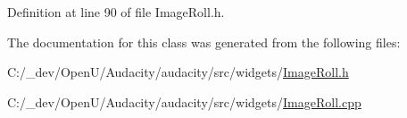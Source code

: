Definition at line 90 of file Image\+Roll.\+h.



The documentation for this class was generated from the following files\+:\begin{DoxyCompactItemize}
\item 
C\+:/\+\_\+dev/\+Open\+U/\+Audacity/audacity/src/widgets/\hyperlink{_image_roll_8h}{Image\+Roll.\+h}\item 
C\+:/\+\_\+dev/\+Open\+U/\+Audacity/audacity/src/widgets/\hyperlink{_image_roll_8cpp}{Image\+Roll.\+cpp}\end{DoxyCompactItemize}
